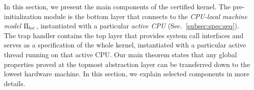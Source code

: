 
In this section, we present the main components of the certified {\mCTOS} kernel. 
The pre-initialization module is the bottom layer that connects to the
 \emph{CPU-local machine model} $\Pi_{\text{loc}}$, instantiated with a 
 particular \emph{active CPU} (\cf Sec.~\ref{subsec:spec:seq}).
The trap handler contains the top layer that provides system call interfaces
and serves as a specification of the whole kernel,
instantiated with a particular active thread
running on that active CPU.
Our main theorem states that any global properties proved at the topmost
abstraction layer can be transferred down to the lowest hardware machine.
In this section, we explain selected components
in more details.

